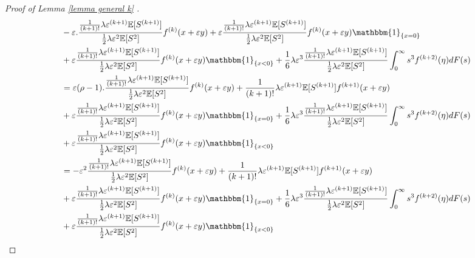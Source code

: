 \documentclass[11pt,letterpaper,reqno]{article}
\theoremstyle{thmstyleone}%
\theoremstyle{thmstyletwo}%
\theoremstyle{thmstylethree}%
\numberwithin{equation}{section}
\begin{document}
\begin{proof}[Proof of Lemma \ref{lemma general k} ]
\begin{align*}
    &-\varepsilon.\frac{\frac{1}{(k+1)!}\lambda \varepsilon^{(k+1)} \mathbb E[S^{(k+1)}]}{\frac{1}{2}\lambda \varepsilon^2 \mathbb E[S^2]} f^{(k)}(x+\varepsilon y)+\varepsilon \frac{\frac{1}{(k+1)!}\lambda \varepsilon^{(k+1)} \mathbb E[S^{(k+1)}]}{\frac{1}{2}\lambda \varepsilon^2 \mathbb E[S^2]}f^{(k)}(x+\varepsilon y)\mathbbm{1}_{\{x=0\}}\\
    &+\varepsilon \frac{\frac{1}{(k+1)!}\lambda \varepsilon^{(k+1)} \mathbb E[S^{(k+1)}]}{\frac{1}{2}\lambda \varepsilon^2 \mathbb E[S^2]}f^{(k)}(x+\varepsilon y)\mathbbm{1}_{\{x<0\}}+\frac{1}{6} \lambda \varepsilon^3 \frac{\frac{1}{(k+1)!}\lambda \varepsilon^{(k+1)} \mathbb E[S^{(k+1)}]}{\frac{1}{2}\lambda \varepsilon^2 \mathbb E[S^2]} \int_0^\infty s^3 f^{(k+2)}(\eta )dF(s)\\
    &=\varepsilon(\rho-1 ).\frac{\frac{1}{(k+1)!}\lambda \varepsilon^{(k+1)} \mathbb E[S^{(k+1)}]}{\frac{1}{2}\lambda \varepsilon^2 \mathbb E[S^2]}f^{(k)}(x+\varepsilon y)+\frac{1}{(k+1)!}\lambda \varepsilon^{(k+1)} \mathbb E[S^{(k+1)}]f^{(k+1)}(x+\varepsilon y)\\
    &+\varepsilon \frac{\frac{1}{(k+1)!}\lambda \varepsilon^{(k+1)} \mathbb E[S^{(k+1)}]}{\frac{1}{2}\lambda \varepsilon^2 \mathbb E[S^2]}  f^{(k)}(x+\varepsilon y)\mathbbm{1}_{\{x=0\}} +\frac{1}{6} \lambda \varepsilon^3 \frac{\frac{1}{(k+1)!}\lambda \varepsilon^{(k+1)} \mathbb E[S^{(k+1)}]}{\frac{1}{2}\lambda \varepsilon^2 \mathbb E[S^2]} \int_0^\infty s^3 f^{(k+2)}(\eta )dF(s)\\
    &+\varepsilon \frac{\frac{1}{(k+1)!}\lambda \varepsilon^{(k+1)} \mathbb E[S^{(k+1)}]}{\frac{1}{2}\lambda \varepsilon^2 \mathbb E[S^2]}f^{(k)}(x+\varepsilon y)\mathbbm{1}_{\{x<0\}}\\
    &=-\varepsilon^2\frac{\frac{1}{(k+1)!}\lambda \varepsilon^{(k+1)} \mathbb E[S^{(k+1)}]}{\frac{1}{2}\lambda \varepsilon^2 \mathbb E[S^2]}f^{(k)}(x+\varepsilon y)+\frac{1}{(k+1)!}\lambda \varepsilon^{(k+1)} \mathbb E[S^{(k+1)}]f^{(k+1)}(x+\varepsilon y)\\
    &+\varepsilon \frac{\frac{1}{(k+1)!}\lambda \varepsilon^{(k+1)} \mathbb E[S^{(k+1)}]}{\frac{1}{2}\lambda \varepsilon^2 \mathbb E[S^2]} f^{(k)}(x+\varepsilon y)\mathbbm{1}_{\{x=0\}}
    +\frac{1}{6} \lambda \varepsilon^3 \frac{\frac{1}{(k+1)!}\lambda \varepsilon^{(k+1)} \mathbb E[S^{(k+1)}]}{\frac{1}{2}\lambda \varepsilon^2 \mathbb E[S^2]} \int_0^\infty s^3 f^{(k+2)}(\eta )dF(s)\\
    &+\varepsilon \frac{\frac{1}{(k+1)!}\lambda \varepsilon^{(k+1)} \mathbb E[S^{(k+1)}]}{\frac{1}{2}\lambda \varepsilon^2 \mathbb E[S^2]}f^{(k)}(x+\varepsilon y)\mathbbm{1}_{\{x<0\}}\\

\end{align*}
\end{proof}
\end{document}
